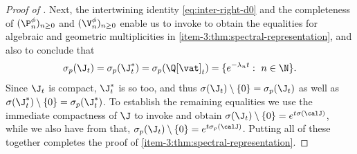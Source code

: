 \begin{proof}[Proof of ]
Next, the intertwining identity \eqref{eq:inter-right-d0} and the completeness of $(\P_n^\phi)_{n \geq 0}$ and $(\V_n^\phi)_{n \geq 0}$ enable us to invoke \cite[Prop.\,11.4]{Patie-Savov-GeL} to obtain the equalities for algebraic and geometric multiplicities in \eqref{item-3:thm:spectral-representation}, and also to conclude that
\begin{equation*}
\sigma_p(\J_t) = \sigma_p(\J_t^*) = \sigma_p(\Q[\vat]_t) = \{e^{-\lambda_n t} : \ n \in \N\}.
\end{equation*}
Since $\J_t$ is compact, $\J_t^*$ is so too, and thus $\sigma(\J_t) \setminus \{0\} = \sigma_p(\J_t)$ as well as
$\sigma(\J_t^*) \setminus \{0\} = \sigma_p(\J_t^*)$. To establish the remaining equalities we use the immediate compactness of $\J$ to invoke \cite[Cor.\,3.12]{EngelNagel} and obtain $\sigma(\J_t) \setminus \{0\} = e^{t\sigma(\calJ)}$, while we also have from \cite[Th.\,3.7]{EngelNagel} that, $\sigma_p(\J_t) \setminus \{0\} = e^{t\sigma_p(\calJ)}$. Putting all of these together completes the proof of \eqref{item-3:thm:spectral-representation}.


\end{proof}
